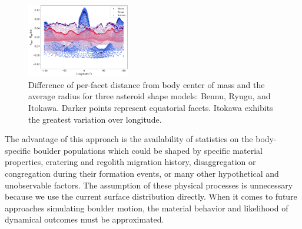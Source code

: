 \begin{figure}[H]
    \centering
    \includegraphics[width=0.4\textwidth]{fig/overlaid_shape_symmetry.png}
    \caption{Difference of per-facet distance from body center of mass and the average radius for three asteroid shape models: Bennu, Ryugu, and Itokawa. Darker points represent equatorial facets. Itokawa exhibits the greatest variation over longitude.}
    \label{fig:symmetry}
\end{figure}
The advantage of this approach is the availability of statistics on the body-specific boulder populations which could be shaped by specific material properties, cratering and regolith migration history, disaggregation or congregation during their formation events, or many other hypothetical and unobservable factors. The assumption of these physical processes is unnecessary because we use the current surface distribution directly. When it comes to future approaches simulating boulder motion, the material behavior and likelihood of dynamical outcomes must be approximated.


